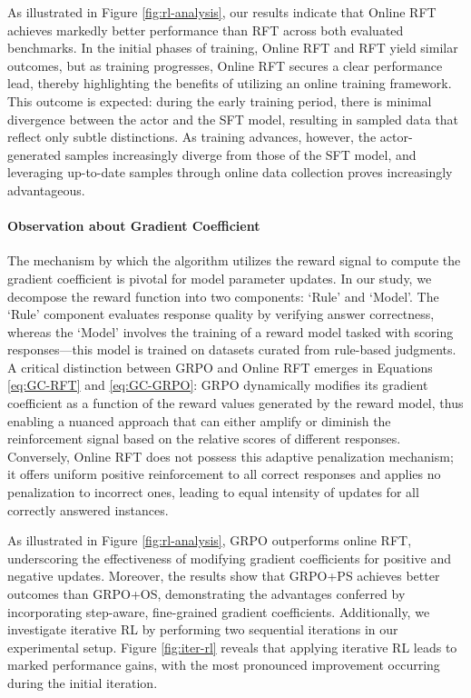\begin{itemize}[topsep=0pt]
\begin{itemize}[topsep=0pt]
As illustrated in Figure \ref{fig:rl-analysis}, our results indicate that Online RFT achieves markedly better performance than RFT across both evaluated benchmarks. In the initial phases of training, Online RFT and RFT yield similar outcomes, but as training progresses, Online RFT secures a clear performance lead, thereby highlighting the benefits of utilizing an online training framework. This outcome is expected: during the early training period, there is minimal divergence between the actor and the SFT model, resulting in sampled data that reflect only subtle distinctions. As training advances, however, the actor-generated samples increasingly diverge from those of the SFT model, and leveraging up-to-date samples through online data collection proves increasingly advantageous.

\paragraph{Observation about Gradient Coefficient} The mechanism by which the algorithm utilizes the reward signal to compute the gradient coefficient is pivotal for model parameter updates. In our study, we decompose the reward function into two components: `Rule' and `Model'. The `Rule' component evaluates response quality by verifying answer correctness, whereas the `Model' involves the training of a reward model tasked with scoring responses—this model is trained on datasets curated from rule-based judgments. A critical distinction between GRPO and Online RFT emerges in Equations \ref{eq:GC-RFT} and \ref{eq:GC-GRPO}: GRPO dynamically modifies its gradient coefficient as a function of the reward values generated by the reward model, thus enabling a nuanced approach that can either amplify or diminish the reinforcement signal based on the relative scores of different responses. Conversely, Online RFT does not possess this adaptive penalization mechanism; it offers uniform positive reinforcement to all correct responses and applies no penalization to incorrect ones, leading to equal intensity of updates for all correctly answered instances.

As illustrated in Figure \ref{fig:rl-analysis}, GRPO outperforms online RFT, underscoring the effectiveness of modifying gradient coefficients for positive and negative updates. Moreover, the results show that GRPO+PS achieves better outcomes than GRPO+OS, demonstrating the advantages conferred by incorporating step-aware, fine-grained gradient coefficients. Additionally, we investigate iterative RL by performing two sequential iterations in our experimental setup. Figure \ref{fig:iter-rl} reveals that applying iterative RL leads to marked performance gains, with the most pronounced improvement occurring during the initial iteration.


\end{itemize}
\end{itemize}
